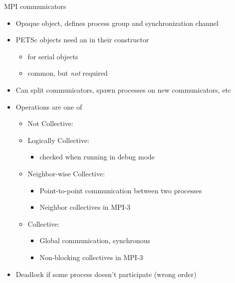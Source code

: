 

\begin{frame}{MPI communicators}
  \begin{itemize}
  \item Opaque object, defines process group and synchronization channel
  \item PETSc objects need an  in their constructor
    \begin{itemize}
    \item {} for serial objects
    \item {} common, but \emph{not} required
    \end{itemize}
  \item Can split communicators, spawn processes on new communicators, etc
  \item Operations are one of
    \begin{itemize}
    \item Not Collective: 
    \item Logically Collective: 
      \begin{itemize}
      \item checked when running in debug mode
      \end{itemize}
    \item Neighbor-wise Collective: 
      \begin{itemize}
      \item Point-to-point communication between two processes
      \item Neighbor collectives in MPI-3
      \end{itemize}
    \item Collective: 
      \begin{itemize}
      \item Global communication, synchronous
      \item Non-blocking collectives in MPI-3
      \end{itemize}
    \end{itemize}
  \item Deadlock if some process doesn't participate (\eg wrong order)
  \end{itemize}
\end{frame}



